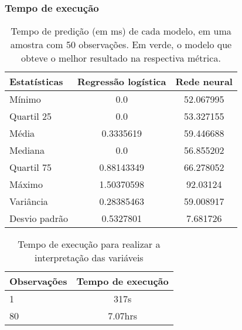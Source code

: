 \subsubsection{Tempo de execução}

\begin{table}[H]
\centering
\begin{tabular}{lcc}
  \hline
  \textbf{Estatísticas} & \textbf{Regressão logística} & \textbf{Rede neural} \\
  \hline
  Mínimo & 0.0 & 52.067995 \\
  Quartil 25 & 0.0 & 53.327155 \\
  Média & 0.3335619 & 59.446688 \\
  Mediana & 0.0 & 56.855202 \\
  Quartil 75 & 0.88143349 & 66.278052 \\
  Máximo & 1.50370598 & 92.03124 \\
  Variância & 0.28385463 & 59.008917 \\
  Desvio padrão & 0.5327801 & 7.681726 \\
  \hline
\end{tabular}
\caption{Tempo de predição (em ms) de cada modelo, em uma amostra com 50 observações. Em verde, o modelo que obteve o melhor resultado na respectiva métrica.}
\label{tab:bench_models}
\end{table}



\begin{table}[H]
\centering
\begin{tabular}{lc}
\hline
\textbf{Observações} & \textbf{Tempo de execução} \\
\hline
1  & 317s \\
80 & 7.07hrs \\
\hline
\end{tabular}
\caption{Tempo de execução para realizar a interpretação das variáveis}
\label{tab:tempo_execucao_shap}
\end{table}
\newpage

